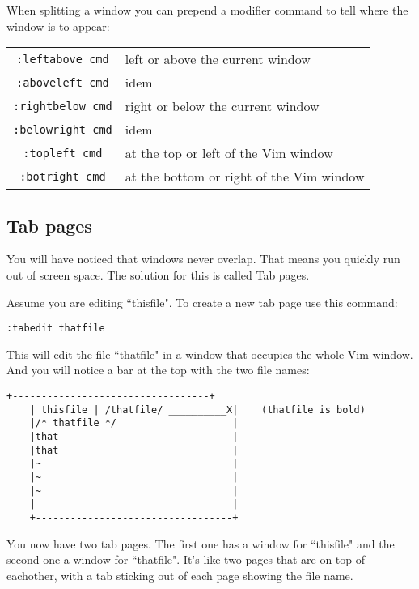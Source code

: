 When splitting a window you can prepend a modifier command to tell where the window is to appear:
\begin{center}
				\begin{longtable}{c l}
								\texttt{:leftabove {cmd}} & left or above the current window \\
								\texttt{:aboveleft {cmd}} & idem \\
								\texttt{:rightbelow {cmd}} & right or below the current window \\
								\texttt{:belowright {cmd}} & idem \\
								\texttt{:topleft {cmd}} & at the top or left of the Vim window \\
								\texttt{:botright {cmd}} & at the bottom or right of the Vim window \\
				\end{longtable}
\end{center}
\subsection{Tab pages}
You will have noticed that windows never overlap.
That means you quickly run out of screen space.
The solution for this is called Tab pages.

Assume you are editing ``thisfile".
To create a new tab page use this command:

 \begin{Verbatim}[samepage=true]
 :tabedit thatfile
 \end{Verbatim}

This will edit the file ``thatfile" in a window that occupies the whole Vim window.
And you will notice a bar at the top with the two file names:

		\begin{Verbatim}[samepage=true]
    +----------------------------------+
    | thisfile | /thatfile/ __________X|    (thatfile is bold)
    |/* thatfile */                    |
    |that                              |
    |that                              |
    |~                                 |
    |~                                 |
    |~                                 |
    |                                  |
    +----------------------------------+
						\end{Verbatim}

You now have two tab pages.
The first one has a window for ``thisfile" and the second one a window for ``thatfile".
It's like two pages that are on top of eachother, with a tab sticking out of each page showing the file name.

